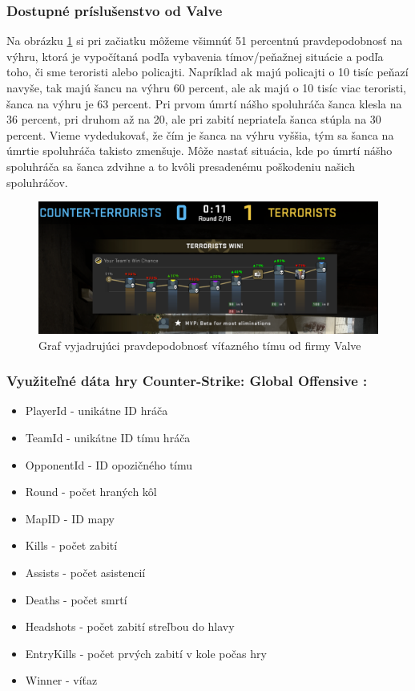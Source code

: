  \subsubsection{Dostupné príslušenstvo od Valve}
Na obrázku \ref{csgograf} si pri začiatku môžeme všimnúť 51 percentnú pravdepodobnosť na výhru, ktorá je vypočítaná podľa vybavenia tímov/peňažnej situácie a podľa toho, či sme teroristi alebo policajti. Napríklad ak majú policajti o 10 tisíc peňazí navyše, tak majú šancu na výhru 60 percent, ale ak majú o 10 tisíc viac teroristi, šanca na výhru je 63 percent. Pri prvom úmrtí nášho spoluhráča šanca klesla na 36 percent, pri druhom až na 20, ale pri zabití nepriateľa šanca stúpla na 30 percent. Vieme vydedukovať, že čím je šanca na výhru vyššia, tým sa šanca na úmrtie spoluhráča takisto zmenšuje. Môže nastať situácia, kde po úmrtí nášho spoluhráča sa šanca zdvihne a to kvôli presadenému poškodeniu našich spoluhráčov.
  
 \begin{figure}[h!]
 
 	\includegraphics[width=.9\textwidth]{figures/jednanula}
 	\centering
 	\caption{Graf vyjadrujúci pravdepodobnosť víťazného tímu od firmy Valve \label{csgograf}}

 \end{figure}

 

\subsubsection{Využiteľné dáta hry Counter-Strike: Global Offensive :}

 \begin{itemize}
 	\item PlayerId - unikátne ID hráča
 	\item TeamId - unikátne ID tímu hráča
 	\item OpponentId - ID opozičného tímu
 	\item Round - počet hraných kôl
 	\item MapID - ID mapy
 	\item Kills - počet zabití
 	\item Assists - počet asistencií
 	\item Deaths - počet smrtí
 	\item Headshots - počet zabití streľbou do hlavy
 	\item EntryKills - počet prvých zabití v kole počas hry
 	\item Winner - víťaz
\end{itemize}
 

